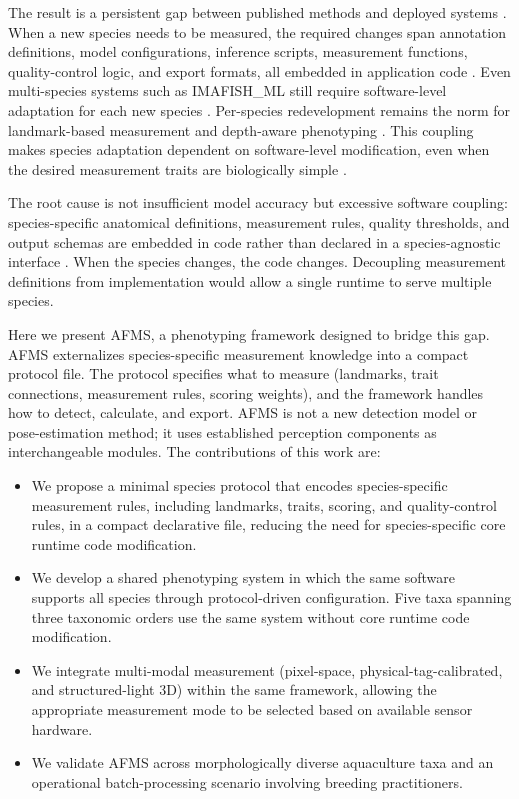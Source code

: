 \documentclass[final,3p,times]{elsarticle}
\begin{document}
The result is a persistent gap between published methods and deployed systems \citep{liu2024fishphenokey}. When a new species needs to be measured, the required changes span annotation definitions, model configurations, inference scripts, measurement functions, quality-control logic, and export formats, all embedded in application code \citep{navarro2016imafish,fernandes2020segmentation}. Even multi-species systems such as IMAFISH\_ML still require software-level adaptation for each new species \citep{navarro2016imafish}. Per-species redevelopment remains the norm for landmark-based measurement \citep{yu2023keypoint} and depth-aware phenotyping \citep{zhao2025stereo,zhou2023inwater}. This coupling makes species adaptation dependent on software-level modification, even when the desired measurement traits are biologically simple \citep{abinaya2022segmental}.

The root cause is not insufficient model accuracy but excessive software coupling: species-specific anatomical definitions, measurement rules, quality thresholds, and output schemas are embedded in code rather than declared in a species-agnostic interface \citep{gonzalez2023phytooracle}. When the species changes, the code changes. Decoupling measurement definitions from implementation would allow a single runtime to serve multiple species.

Here we present AFMS, a phenotyping framework designed to bridge this gap. AFMS externalizes species-specific measurement knowledge into a compact protocol file. The protocol specifies what to measure (landmarks, trait connections, measurement rules, scoring weights), and the framework handles how to detect, calculate, and export. AFMS is not a new detection model or pose-estimation method; it uses established perception components \citep{lyu2022rtmdet,jiang2023rtmpose,chen2019mmdetection,mmpose,lin2014coco} as interchangeable modules. The contributions of this work are:

\begin{itemize}
  \item We propose a minimal species protocol that encodes species-specific measurement rules, including landmarks, traits, scoring, and quality-control rules, in a compact declarative file, reducing the need for species-specific core runtime code modification.
  \item We develop a shared phenotyping system in which the same software supports all species through protocol-driven configuration. Five taxa spanning three taxonomic orders use the same system without core runtime code modification.
  \item We integrate multi-modal measurement (pixel-space, physical-tag-calibrated, and structured-light 3D) within the same framework, allowing the appropriate measurement mode to be selected based on available sensor hardware.
  \item We validate AFMS across morphologically diverse aquaculture taxa and an operational batch-processing scenario involving breeding practitioners.
\end{itemize}
\end{document}
